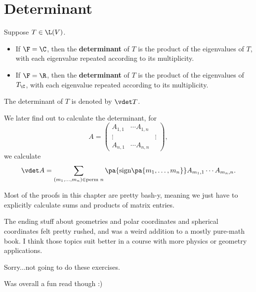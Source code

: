\section{Determinant}

\begin{definition}
  Suppose $T \in \L(V)$.
  \begin{itemize}
    \item If $\F = \C$, then the \textbf{determinant} of $T$ is the product of the eigenvalues of $T$, with each eigenvalue repeated according to its multiplicity.
    \item If $\F = \R$, then the \textbf{determinant} of $T$ is the product of the eigenvalues of $T_{\C}$, with each eigenvalue repeated according to its multiplicity.
  \end{itemize}
  The determinant of $T$ is denoted by $\vdet T$.

  We later find out to calculate the determinant, for
  \begin{equation}
    A = \begin{pmatrix}
      A_{1, 1} & \cdots A_{1, n}          \\
      \vdots   &                 & \vdots \\
      A_{n, 1} & \cdots A_{n, n}
    \end{pmatrix},
  \end{equation}
  we calculate
  \begin{equation}
    \vdet A = \sum_{(m_1, \dots, m_n) \in \text{perm }n} \pa{
      \text{sign}\pa{
        m_1, \dots, m_n
      }
    } A_{m_1, 1} \cdots A_{m_n, n}.
  \end{equation}
\end{definition}

Most of the proofs in this chapter are pretty bash-y, meaning we just have to explicitly calculate sums and products of matrix entries.

The ending stuff about geometries and polar coordinates and spherical coordinates felt pretty rushed, and was a weird addition to a mostly pure-math book.
I think those topics suit better in a course with more physics or geometry applications.

Sorry...not going to do these exercises.

Was overall a fun read though :)
